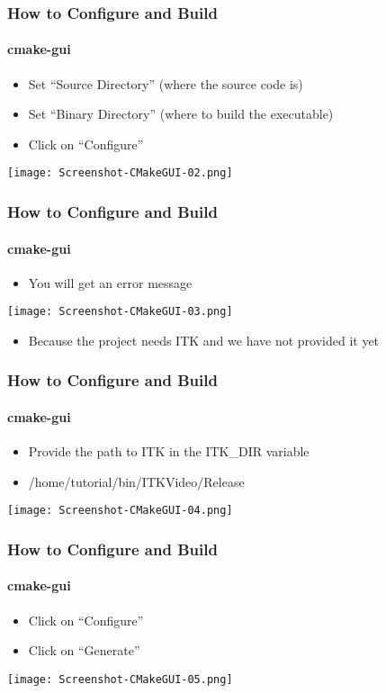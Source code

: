 \begin{frame}[fragile]
\frametitle{How to Configure and Build}
\framesubtitle{cmake-gui}
\begin{itemize}
\item Set ``Source Directory'' (where the source code is)
\item Set ``Binary Directory'' (where to build the executable)
\item Click on ``Configure''
\end{itemize}
\begin{center}
  \texttt{[image: Screenshot-CMakeGUI-02.png]}
\end{center}
\end{frame}

\begin{frame}[fragile]
\frametitle{How to Configure and Build}
\framesubtitle{cmake-gui}
\begin{itemize}
\item You will get an error message
\end{itemize}
\begin{center}
  \texttt{[image: Screenshot-CMakeGUI-03.png]}
\end{center}
\begin{itemize}
\item Because the project needs ITK and we have not provided it yet
\end{itemize}
\end{frame}


\begin{frame}[fragile]
\frametitle{How to Configure and Build}
\framesubtitle{cmake-gui}
\begin{itemize}
\item Provide the path to ITK in the ITK\_DIR variable
\item /home/tutorial/bin/ITKVideo/Release
\end{itemize}
\begin{center}
  \texttt{[image: Screenshot-CMakeGUI-04.png]}
\end{center}
\end{frame}

\begin{frame}[fragile]
\frametitle{How to Configure and Build}
\framesubtitle{cmake-gui}
\begin{itemize}
\item Click on ``Configure''
\item Click on ``Generate''
\end{itemize}
\begin{center}
  \texttt{[image: Screenshot-CMakeGUI-05.png]}
\end{center}
\end{frame}

